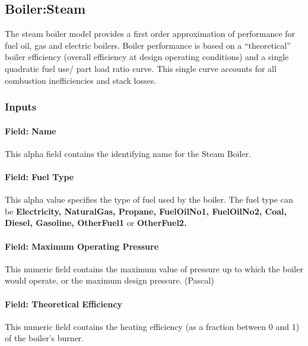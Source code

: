 \subsection{Boiler:Steam}\label{boilersteam}

The steam boiler model provides a first order approximation of performance for fuel oil, gas and electric boilers. Boiler performance is based on a ``theoretical'' boiler efficiency (overall efficiency at design operating conditions) and a single quadratic fuel use/ part load ratio curve. This single curve accounts for all combustion inefficiencies and stack losses.

\subsubsection{Inputs}\label{inputs-11-012}

\paragraph{Field: Name}\label{field-name-10-011}

This alpha field contains the identifying name for the Steam Boiler.

\paragraph{Field: Fuel Type}\label{field-fuel-type-4}

This alpha value specifies the type of fuel used by the boiler. The fuel type can be \textbf{Electricity, NaturalGas, Propane, FuelOilNo1, FuelOilNo2, Coal, Diesel, Gasoline, OtherFuel1} or \textbf{OtherFuel2.}

\paragraph{Field: Maximum Operating Pressure}\label{field-maximum-operating-pressure}

This numeric field contains the maximum value of pressure up to which the boiler would operate, or the maximum design pressure. (Pascal)

\paragraph{Field: Theoretical Efficiency}\label{field-theoretical-efficiency}

This numeric field contains the heating efficiency (as a fraction between 0 and 1) of the boiler's burner.

